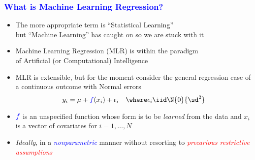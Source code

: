 \documentclass[11pt,dvipsnames,usenames,times]{beamer}
\begin{document}
\begin{frame}
\frametitle{\bf\textcolor{blue}{What is Machine Learning Regression?}}
\boldmath

\begin{itemize}
\item The more appropriate term is ``Statistical Learning''\\ but 
``Machine Learning'' has caught on so we are stuck with it
\item Machine Learning Regression (MLR) is within the paradigm\\
 of Artificial (or Computational) Intelligence
\item MLR is extensible, but for the moment consider the general
  regression case of a continuous outcome with Normal errors
\begin{align*}
y_i & = \mu + \textcolor{blue}{f}(x_i) + \epsilon_i 
& \where \epsilon_i \iid \N{0}{\textcolor{black}{\sd^2}}
\end{align*}
\item %
$\textcolor{blue}{f}$ is an
  unspecified %
  function whose form is to be {\it learned} from the data and $x_i$
  is a vector of covariates for $i=1, \dots, N$
\item {\it Ideally}, in a \textcolor{blue}{\it nonparametric} manner
  without resorting to \textcolor{red}{\it precarious restrictive
    assumptions}
\end{itemize}
\end{frame}
\begin{comment}
\item A common extension in MLR 
\begin{align*}
y_i & = \mu + \textcolor{blue}{f}(x_i) + \sd \textcolor{red}{s}(x_i)\epsilon_i 
& \where \epsilon_i \iid F_{\epsilon}
\end{align*}
\item And $\textcolor{blue}{f}$ and $\textcolor{red}{s}$ will both 
be {\it learned}, but how?
\item {\it Ideally} in a 
\textcolor{blue}{\it nonparametric} manner
without resorting to \textcolor{red}{\it precarious restrictive assumptions}
\end{comment}
\end{document}
